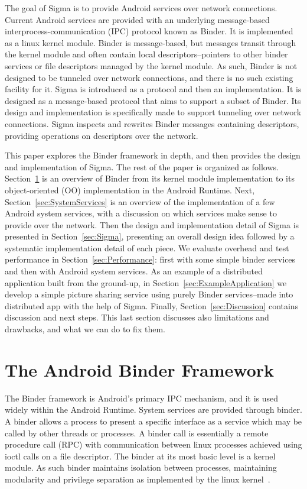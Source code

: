 \documentclass[prodmode]{acmlarge}
\begin{document}
The goal of Sigma is to provide Android services over network connections. Current Android services are provided with an underlying message-based interprocess-communication (IPC) protocol known as Binder. It is implemented as a linux kernel module. Binder is message-based, but messages transit through the kernel module and often contain local descriptors--pointers to other binder services or file descriptors managed by the kernel module. As such, Binder is not designed to be tunneled over network connections, and there is no such existing facility for it. Sigma is introduced as a protocol and then an implementation. It is designed as a message-based protocol that aims to support a subset of Binder. Its design and implementation is specifically made to support tunneling over network connections. Sigma inspects and rewrites Binder messages containing descriptors, providing operations on descriptors over the network.

This paper explores the Binder framework in depth, and then provides the design and implementation of Sigma. The rest of the paper is organized as follows. Section~\ref{sec:AndroidBinderFramework} is an overview of Binder from its kernel module implementation to its object-oriented (OO) implementation in the Android Runtime. Next, Section~\ref{sec:SystemServices} is an overview of the implementation of a few Android system services, with a discussion on which services make sense to provide over the network. Then the design and implementation detail of Sigma is presented in Section~\ref{sec:Sigma}, presenting an overall design idea followed by a systematic implementation detail of each piece. We evaluate overhead and test performance in Section~\ref{sec:Performance}: first with some simple binder services and then with Android system services. As an example of a distributed application built from the ground-up, in Section~\ref{sec:ExampleApplication} we develop a simple picture sharing service using purely Binder services--made into distributed app with the help of Sigma. Finally, Section~\ref{sec:Discussion} contains discussion and next steps. This last section discusses also limitations and drawbacks, and what we can do to fix them.

\section{The Android Binder Framework}
\label{sec:AndroidBinderFramework}
The Binder framework is Android's primary IPC mechanism, and it is used widely within the Android Runtime. System services are provided through binder. A binder allows a process to present a specific interface as a service which may be called by other threads or processes. A binder call is essentially a remote procedure call (RPC) with communication between linux processes achieved using ioctl calls on a file descriptor. The binder at its most basic level is a kernel module. As such binder maintains isolation between processes, maintaining modularity and privilege separation as implemented by the linux kernel~\cite{OpenBinder}.
\end{document}
